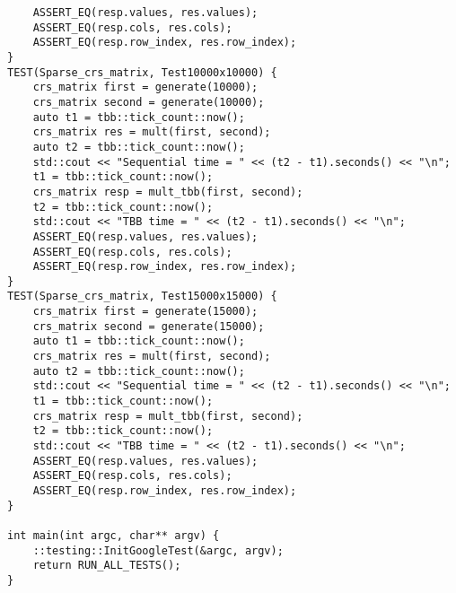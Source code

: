 \documentclass{report}
\begin{document}
\begin{lstlisting}
    ASSERT_EQ(resp.values, res.values);
    ASSERT_EQ(resp.cols, res.cols);
    ASSERT_EQ(resp.row_index, res.row_index);
}
TEST(Sparse_crs_matrix, Test10000x10000) {
    crs_matrix first = generate(10000);
    crs_matrix second = generate(10000);
    auto t1 = tbb::tick_count::now();
    crs_matrix res = mult(first, second);
    auto t2 = tbb::tick_count::now();
    std::cout << "Sequential time = " << (t2 - t1).seconds() << "\n";
    t1 = tbb::tick_count::now();
    crs_matrix resp = mult_tbb(first, second);
    t2 = tbb::tick_count::now();
    std::cout << "TBB time = " << (t2 - t1).seconds() << "\n";
    ASSERT_EQ(resp.values, res.values);
    ASSERT_EQ(resp.cols, res.cols);
    ASSERT_EQ(resp.row_index, res.row_index);
}
TEST(Sparse_crs_matrix, Test15000x15000) {
    crs_matrix first = generate(15000);
    crs_matrix second = generate(15000);
    auto t1 = tbb::tick_count::now();
    crs_matrix res = mult(first, second);
    auto t2 = tbb::tick_count::now();
    std::cout << "Sequential time = " << (t2 - t1).seconds() << "\n";
    t1 = tbb::tick_count::now();
    crs_matrix resp = mult_tbb(first, second);
    t2 = tbb::tick_count::now();
    std::cout << "TBB time = " << (t2 - t1).seconds() << "\n";
    ASSERT_EQ(resp.values, res.values);
    ASSERT_EQ(resp.cols, res.cols);
    ASSERT_EQ(resp.row_index, res.row_index);
}

int main(int argc, char** argv) {
    ::testing::InitGoogleTest(&argc, argv);
    return RUN_ALL_TESTS();
}
\end{lstlisting}
\end{document}
